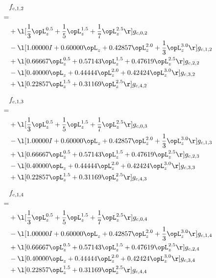 \begin{alignat}{2} 
\label{eq:f_12_0} 
& f_{c,1,2} \nonumber \\ 
 = \\ 
& + \l[ \frac{1}{3} \opL_z^{0.5} + \frac{1}{5} \opL_z^{1.5} + \frac{1}{7} \opL_z^{2.5}  \r] g_{c,0,2} \nonumber \\ 
& - \l[  1.00000 I +  0.60000 \opL_z +  0.42857 \opL_z^{2.0} + \frac{1}{3} \opL_z^{3.0}  \r] g_{c,1,2} \nonumber \\ 
& + \l[  0.66667 \opL_z^{0.5} +  0.57143 \opL_z^{1.5} +  0.47619 \opL_z^{2.5}  \r] g_{c,2,2} \nonumber \\ 
& - \l[  0.40000 \opL_z +  0.44444 \opL_z^{2.0} +  0.42424 \opL_z^{3.0}  \r] g_{c,3,2} \nonumber \\ 
& + \l[  0.22857 \opL_z^{1.5} +  0.31169 \opL_z^{2.5}  \r] g_{c,4,2} \nonumber \\ 
\end{alignat} 


\begin{alignat}{2} 
\label{eq:f_13_0} 
& f_{c,1,3} \nonumber \\ 
 = \\ 
& + \l[ \frac{1}{3} \opL_z^{0.5} + \frac{1}{5} \opL_z^{1.5} + \frac{1}{7} \opL_z^{2.5}  \r] g_{c,0,3} \nonumber \\ 
& - \l[  1.00000 I +  0.60000 \opL_z +  0.42857 \opL_z^{2.0} + \frac{1}{3} \opL_z^{3.0}  \r] g_{c,1,3} \nonumber \\ 
& + \l[  0.66667 \opL_z^{0.5} +  0.57143 \opL_z^{1.5} +  0.47619 \opL_z^{2.5}  \r] g_{c,2,3} \nonumber \\ 
& - \l[  0.40000 \opL_z +  0.44444 \opL_z^{2.0} +  0.42424 \opL_z^{3.0}  \r] g_{c,3,3} \nonumber \\ 
& + \l[  0.22857 \opL_z^{1.5} +  0.31169 \opL_z^{2.5}  \r] g_{c,4,3} \nonumber \\ 
\end{alignat} 


\begin{alignat}{2} 
\label{eq:f_14_0} 
& f_{c,1,4} \nonumber \\ 
 = \\ 
& + \l[ \frac{1}{3} \opL_z^{0.5} + \frac{1}{5} \opL_z^{1.5} + \frac{1}{7} \opL_z^{2.5}  \r] g_{c,0,4} \nonumber \\ 
& - \l[  1.00000 I +  0.60000 \opL_z +  0.42857 \opL_z^{2.0} + \frac{1}{3} \opL_z^{3.0}  \r] g_{c,1,4} \nonumber \\ 
& + \l[  0.66667 \opL_z^{0.5} +  0.57143 \opL_z^{1.5} +  0.47619 \opL_z^{2.5}  \r] g_{c,2,4} \nonumber \\ 
& - \l[  0.40000 \opL_z +  0.44444 \opL_z^{2.0} +  0.42424 \opL_z^{3.0}  \r] g_{c,3,4} \nonumber \\ 
& + \l[  0.22857 \opL_z^{1.5} +  0.31169 \opL_z^{2.5}  \r] g_{c,4,4} \nonumber \\ 
\end{alignat} 


